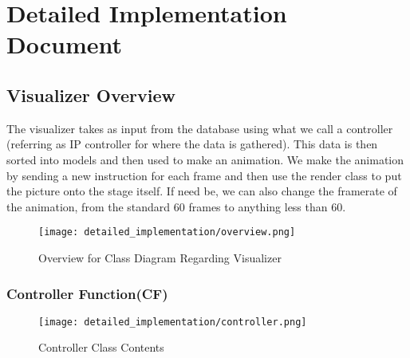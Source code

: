 \documentclass[../document]{subfiles}
\begin{document}
\section{Detailed Implementation Document}
\label{sec:detailed_implementation_document}

\subsection{Visualizer Overview}
The visualizer takes as input from the database using what we call a controller (referring as IP controller for where the data is gathered). This data is then sorted into models and then used to make an animation. We make the animation by sending a new instruction for each frame and then use the render class to put the picture onto the stage itself. If need be, we can also change the framerate of the animation, from the standard 60 frames to anything less than 60.

\begin{figure}[H]
\centering
\texttt{[image: detailed\_implementation/overview.png]}
\caption{Overview for Class Diagram Regarding Visualizer}
\end{figure}

\subsubsection{Controller Function(CF)}

\begin{figure}[H]
\centering
\texttt{[image: detailed\_implementation/controller.png]}
\caption{Controller Class Contents}
\end{figure}
\end{document}

